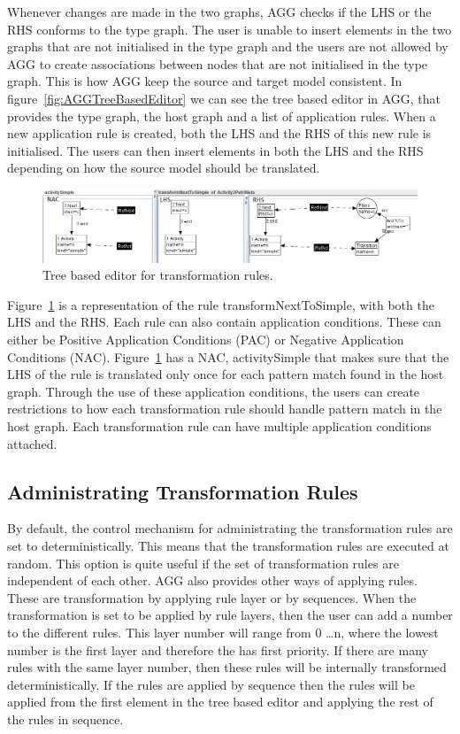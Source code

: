 \documentclass[pdftex,11pt,a4paper]{article}
\begin{document}
Whenever changes are made in the two graphs, AGG checks if the LHS or the RHS
conforms to the type graph. The user is unable to insert elements in the two
graphs that are not initialised in the type graph and the users are not allowed
by AGG to create associations between nodes that are not initialised in the type
graph. This is how AGG keep the source and target model consistent. In
figure~\ref{fig:AGGTreeBasedEditor} we can see the tree based editor in AGG,
that provides the type graph, the host graph and a list of application rules.
When a new application rule is created, both the LHS and the RHS of this new
rule is initialised. The users can then insert elements in both the LHS and the
RHS depending on how the source model should be translated. 

\begin{figure}[H]
	\centering
	\includegraphics[scale=0.5]{figures/LHSvsRHSAGG.png}
	\caption{Tree based editor for transformation rules.}
	\label{fig:LHSvsRHSAGG}
\end{figure}

Figure~\ref{fig:LHSvsRHSAGG} is a representation of the rule
transformNextToSimple, with both the LHS and the RHS. Each rule can also
contain application conditions. These can either be Positive Application
Conditions (PAC) or Negative Application Conditions (NAC).
Figure~\ref{fig:LHSvsRHSAGG} has a NAC, activitySimple that makes sure that the
LHS of the rule is translated only once for each pattern match found in the
host graph. Through the use of these application conditions, the users can
create restrictions to how each transformation rule should handle pattern match
in the host graph. Each transformation rule can have multiple application
conditions attached.

\subsection{Administrating Transformation Rules}

By default, the control mechanism for administrating the transformation rules
are set to deterministically. This means that the transformation rules are
executed at random. This option is quite useful if the set of transformation
rules are independent of each other. AGG also provides other ways of applying
rules. These are transformation by applying rule layer or by sequences. When the
transformation is set to be applied by rule layers, then the user can add a
number to the different rules. This layer number will range from 0 \ldots n,
where the lowest number is the first layer and therefore the has first
priority. If there are many rules with the same layer number, then these rules
will be internally transformed deterministically. If the rules are applied
by sequence then the rules will be applied from the first element in the tree
based editor and applying the rest of the rules in sequence.
\end{document}
